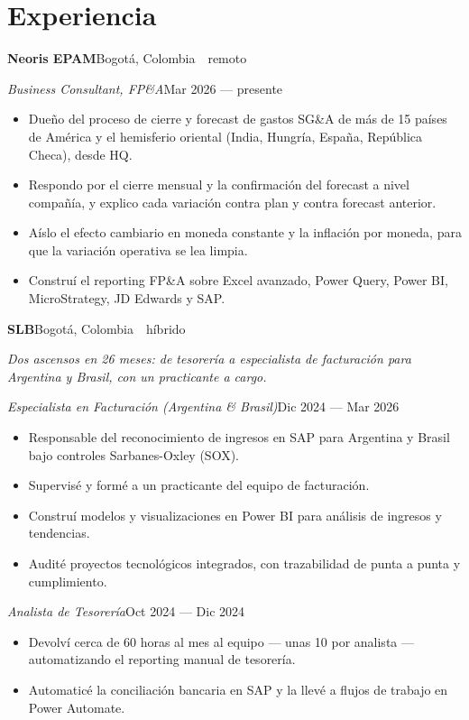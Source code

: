 \documentclass[a4paper,10pt]{article}
\newcommand{\headline}[2]{\needspace{3\baselineskip}\textbf{\color{ink}#1}\hfill{\small #2}\par}
\newcommand{\subline}[2]{\textit{#1}\hfill{\small #2}\par}
\begin{document}
\section*{Experiencia}
\headline{Neoris EPAM}{Bogotá, Colombia \,\textperiodcentered\, remoto}
\vspace{1pt}
\subline{Business Consultant, FP\&A}{Mar 2026 --- presente}
\begin{itemize}[leftmargin=1.1em, itemsep=0pt, topsep=1pt, parsep=0pt]
  \item Dueño del proceso de cierre y forecast de gastos SG\&A de más de 15 países de América y el hemisferio oriental (India, Hungría, España, República Checa), desde HQ.
  \item Respondo por el cierre mensual y la confirmación del forecast a nivel compañía, y explico cada variación contra plan y contra forecast anterior.
  \item Aíslo el efecto cambiario en moneda constante y la inflación por moneda, para que la variación operativa se lea limpia.
  \item Construí el reporting FP\&A sobre Excel avanzado, Power Query, Power BI, MicroStrategy, JD Edwards y SAP.
\end{itemize}
\vspace{4pt}
\headline{SLB}{Bogotá, Colombia \,\textperiodcentered\, híbrido}
{\small\itshape\color{cold} Dos ascensos en 26 meses: de tesorería a especialista de facturación para Argentina y Brasil, con un practicante a cargo.}\par
\vspace{1pt}
\subline{Especialista en Facturación (Argentina \& Brasil)}{Dic 2024 --- Mar 2026}
\begin{itemize}[leftmargin=1.1em, itemsep=0pt, topsep=1pt, parsep=0pt]
  \item Responsable del reconocimiento de ingresos en SAP para Argentina y Brasil bajo controles Sarbanes-Oxley (SOX).
  \item Supervisé y formé a un practicante del equipo de facturación.
  \item Construí modelos y visualizaciones en Power BI para análisis de ingresos y tendencias.
  \item Audité proyectos tecnológicos integrados, con trazabilidad de punta a punta y cumplimiento.
\end{itemize}
\subline{Analista de Tesorería}{Oct 2024 --- Dic 2024}
\begin{itemize}[leftmargin=1.1em, itemsep=0pt, topsep=1pt, parsep=0pt]
  \item Devolví cerca de 60 horas al mes al equipo --- unas 10 por analista --- automatizando el reporting manual de tesorería.
  \item Automaticé la conciliación bancaria en SAP y la llevé a flujos de trabajo en Power Automate.
\end{itemize}
\end{document}
